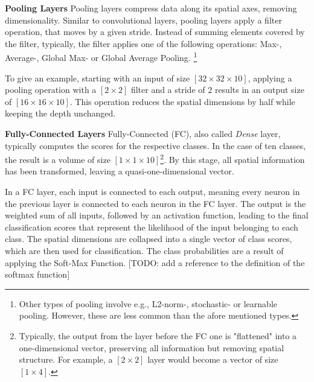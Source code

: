 \vspace{1em}

\textbf{Pooling Layers}\label{theoretical_classification_pooling_layers}
Pooling layers compress data along its spatial axes, removing dimensionality. Similar to convolutional layers, pooling layers apply a filter operation, that moves by a given stride. Instead of summing elements covered by the filter, typically, the filter applies one of the following operations: Max-, Average-, Global Max- or Global Average Pooling. \footnote{Other types of pooling involve e.g., L2-norm-, stochastic- or learnable pooling. However, these are less common than the afore mentioned types.}

To give an example, starting with an input of size $[32 \times 32 \times 10]$, applying a pooling operation with a $[2 \times 2]$ filter and a stride of 2 results in an output size of $[16 \times 16 \times 10]$. This operation reduces the spatial dimensions by half while keeping the depth unchanged.

\vspace{1em}

\textbf{Fully-Connected Layers}\label{theoretical_classification_fully_connected_layers}
Fully-Connected (FC), also called \textit{Dense} layer, typically computes the scores for the respective classes. In the case of ten classes, the result is a volume of size $[1 \times 1 \times 10]$\footnote{Typically, the output from the layer before the FC one is "flattened" into a one-dimensional vector, preserving all information but removing spatial structure. For example, a $[2 \times 2]$ layer would become a vector of size $[1 \times 4]$.}. By this stage, all spatial information has been transformed, leaving a quasi-one-dimensional vector. 

In a FC layer, each input is connected to each output, meaning every neuron in the previous layer is connected to each neuron in the FC layer. The output is the weighted sum of all inputs, followed by an activation function, leading to the final classification scores that represent the likelihood of the input belonging to each class. The spatial dimensions are collapsed into a single vector of class scores, which are then used for classification. The class probabilities are a result of applying the Soft-Max Function. [TODO: add a reference to the definition of the softmax function]

